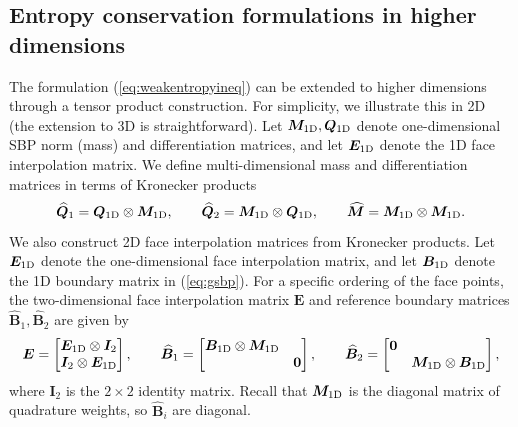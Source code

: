 \documentclass{svjour3}                     %
\renewcommand{\hat}{\widehat}
\begin{document}
\subsection{Entropy conservation formulations in higher dimensions}

The formulation (\ref{eq:weakentropyineq}) can be extended to higher dimensions through a tensor product construction.  For simplicity, we illustrate this in 2D (the extension to 3D is straightforward).  Let $\bm{M}_{\rm 1D}, \bm{Q}_{\rm 1D}$ denote one-dimensional SBP norm (mass) and differentiation matrices, and let $\bm{E}_{\rm 1D}$ denote the 1D face interpolation matrix.  We define multi-dimensional  mass and differentiation matrices in terms of Kronecker products  
\[
\hat{\bm{Q}}_1 = \bm{Q}_{\rm 1D} \otimes \bm{M}_{\rm 1D}, \qquad \hat{\bm{Q}}_2  = \bm{M}_{\rm 1D} \otimes \bm{Q}_{\rm 1D}, \qquad \hat{\bm{M}} = \bm{M}_{\rm 1D} \otimes  \bm{M}_{\rm 1D}.
\]
We also construct 2D face interpolation matrices from Kronecker products.  Let $\bm{E}_{\rm 1D}$ denote the one-dimensional face interpolation matrix, and let $\bm{B}_{\rm 1D}$ denote the 1D boundary matrix in (\ref{eq:gsbp}).  For a specific ordering of the face points, the two-dimensional face interpolation matrix $\bm{E}$ and reference boundary matrices $\hat{\bm{B}}_1, \hat{\bm{B}}_2$ are given by
\begin{equation}
\bm{E} = \begin{bmatrix}
\bm{E}_{\rm 1D} \otimes \bm{I}_{2}\\
\bm{I}_{2} \otimes \bm{E}_{\rm 1D} 
\end{bmatrix}, \qquad 
\hat{\bm{B}}_1 = \begin{bmatrix}
\bm{B}_{\rm 1D} \otimes \bm{M}_{\rm 1D} & \\
& \bm{0}
\end{bmatrix}, \qquad 
\hat{\bm{B}}_2 = \begin{bmatrix}
\bm{0} &\\
& \bm{M}_{\rm 1D} \otimes \bm{B}_{\rm 1D} 
\end{bmatrix},
\label{eq:EBdefs}
\end{equation}
where $\bm{I}_2$ is the $2\times 2$ identity matrix.  Recall that $\bm{M}_{\rm 1D}$ is the diagonal matrix of quadrature weights, so $\hat{\bm{B}}_i$ are diagonal.  
\end{document}
